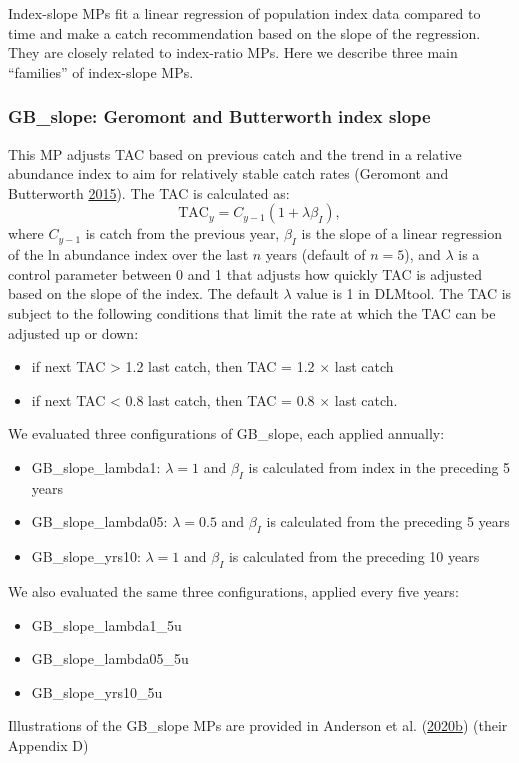 \documentclass[11pt]{book}
\begin{document}
Index-slope MPs fit a linear regression of population index data compared to time and make a catch recommendation based on the slope of the regression. They are closely related to index-ratio MPs. Here we describe three main ``families'' of index-slope MPs.

\hypertarget{sec:mp-gb-slope}{%
\subsubsection{GB\_slope: Geromont and Butterworth index slope}\label{sec:mp-gb-slope}}

This MP adjusts TAC based on previous catch and the trend in a relative abundance index to aim for relatively stable catch rates (Geromont and Butterworth \protect\hyperlink{ref-geromont2015}{2015}). The TAC is calculated as:
\begin{equation}
\textrm{TAC}_y= C_{y-1}(1+\lambda \beta_I),
\end{equation}
where \(C_{y-1}\) is catch from the previous year, \(\beta_I\) is the slope of a linear regression of the ln abundance index over the last \(n\) years (default of \(n = 5\)), and \(\lambda\) is a control parameter between 0 and 1 that adjusts how quickly TAC is adjusted based on the slope of the index. The default \(\lambda\) value is 1 in DLMtool. The TAC is subject to the following conditions that limit the rate at which the TAC can be adjusted up or down:
\begin{itemize}

\item
  if next TAC \textgreater{} 1.2 last catch, then TAC = 1.2 \(\times\) last catch
\item
  if next TAC \textless{} 0.8 last catch, then TAC = 0.8 \(\times\) last catch.
\end{itemize}
We evaluated three configurations of GB\_slope, each applied annually:
\begin{itemize}
\item
  GB\_slope\_lambda1: \(\lambda = 1\) and \(\beta_I\) is calculated from index in the preceding 5 years
\item
  GB\_slope\_lambda05: \(\lambda = 0.5\) and \(\beta_I\) is calculated from the preceding 5 years
\item
  GB\_slope\_yrs10: \(\lambda = 1\) and \(\beta_I\) is calculated from the preceding 10 years
\end{itemize}
We also evaluated the same three configurations, applied every five years:
\begin{itemize}
\item
  GB\_slope\_lambda1\_5u
\item
  GB\_slope\_lambda05\_5u
\item
  GB\_slope\_yrs10\_5u
\end{itemize}
Illustrations of the GB\_slope MPs are provided in Anderson et al. (\protect\hyperlink{ref-anderson2020gfmp}{2020}\protect\hyperlink{ref-anderson2020gfmp}{b}) (their Appendix D)
\end{document}
